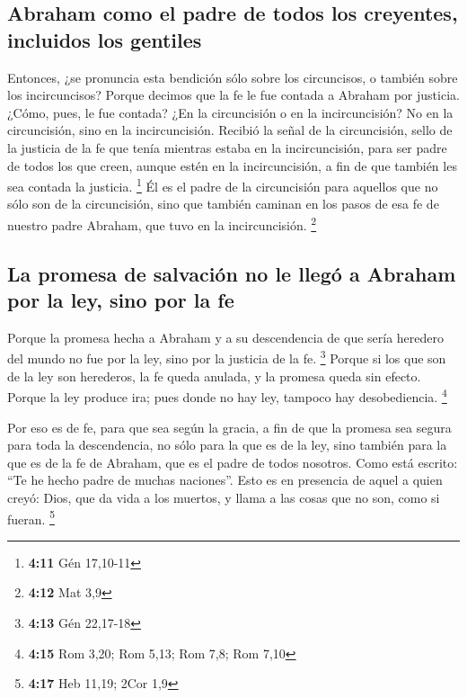 \begin{paracol}{2}
\hypertarget{abraham-como-el-padre-de-todos-los-creyentes-incluidos-los-gentiles}{%
\subsection{Abraham como el padre de todos los creyentes, incluidos los
gentiles}\label{abraham-como-el-padre-de-todos-los-creyentes-incluidos-los-gentiles}}

 Entonces, ¿se pronuncia esta bendición sólo sobre los
circuncisos, o también sobre los incircuncisos? Porque decimos que la fe
le fue contada a Abraham por justicia.  ¿Cómo, pues, le
fue contada? ¿En la circuncisión o en la incircuncisión? No en la
circuncisión, sino en la incircuncisión.  Recibió la
señal de la circuncisión, sello de la justicia de la fe que tenía
mientras estaba en la incircuncisión, para ser padre de todos los que
creen, aunque estén en la incircuncisión, a fin de que también les sea
contada la justicia. \footnote{\textbf{4:11} Gén 17,10-11}
 Él es el padre de la circuncisión para aquellos que no
sólo son de la circuncisión, sino que también caminan en los pasos de
esa fe de nuestro padre Abraham, que tuvo en la incircuncisión.
\footnote{\textbf{4:12} Mat 3,9}

\hypertarget{la-promesa-de-salvaciuxf3n-no-le-lleguxf3-a-abraham-por-la-ley-sino-por-la-fe}{%
\subsection{La promesa de salvación no le llegó a Abraham por la ley,
sino por la
fe}\label{la-promesa-de-salvaciuxf3n-no-le-lleguxf3-a-abraham-por-la-ley-sino-por-la-fe}}

 Porque la promesa hecha a Abraham y a su descendencia de
que sería heredero del mundo no fue por la ley, sino por la justicia de
la fe. \footnote{\textbf{4:13} Gén 22,17-18}  Porque si
los que son de la ley son herederos, la fe queda anulada, y la promesa
queda sin efecto.  Porque la ley produce ira; pues donde
no hay ley, tampoco hay desobediencia. \footnote{\textbf{4:15} Rom 3,20;
  Rom 5,13; Rom 7,8; Rom 7,10}

 Por eso es de fe, para que sea según la gracia, a fin de
que la promesa sea segura para toda la descendencia, no sólo para la que
es de la ley, sino también para la que es de la fe de Abraham, que es el
padre de todos nosotros.  Como está escrito: ``Te he
hecho padre de muchas naciones''. Esto es en presencia de aquel a quien
creyó: Dios, que da vida a los muertos, y llama a las cosas que no son,
como si fueran. \footnote{\textbf{4:17} Heb 11,19; 2Cor 1,9}


\end{paracol}
